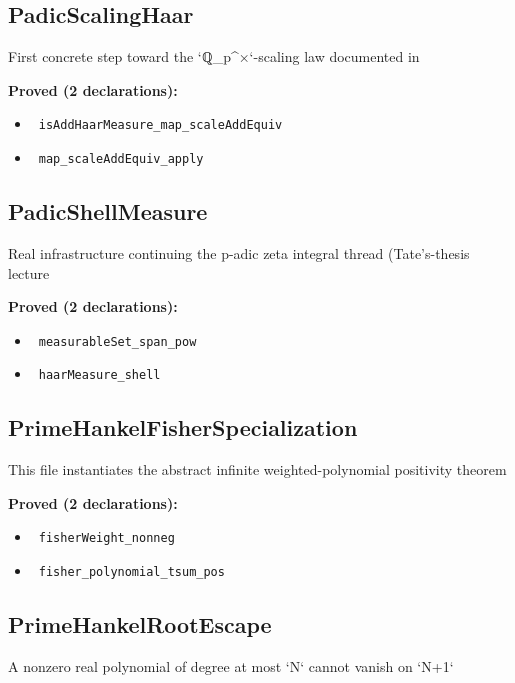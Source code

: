 \documentclass{report}
\theoremstyle{definition}
\begin{document}
\subsection{PadicScalingHaar}
First concrete step toward the `ℚ\_p^×`-scaling law documented in

\noindent\textbf{Proved (2 declarations):}
\begin{itemize}
  \item {}\leanok\ \texttt{isAddHaarMeasure\_map\_scaleAddEquiv}
  \item {}\leanok\ \texttt{map\_scaleAddEquiv\_apply}
\end{itemize}

\subsection{PadicShellMeasure}
Real infrastructure continuing the p-adic zeta integral thread (Tate's-thesis lecture

\noindent\textbf{Proved (2 declarations):}
\begin{itemize}
  \item {}\leanok\ \texttt{measurableSet\_span\_pow}
  \item {}\leanok\ \texttt{haarMeasure\_shell}
\end{itemize}

\subsection{PrimeHankelFisherSpecialization}
This file instantiates the abstract infinite weighted-polynomial positivity theorem

\noindent\textbf{Proved (2 declarations):}
\begin{itemize}
  \item {}\leanok\ \texttt{fisherWeight\_nonneg}
  \item {}\leanok\ \texttt{fisher\_polynomial\_tsum\_pos}
\end{itemize}

\subsection{PrimeHankelRootEscape}
A nonzero real polynomial of degree at most `N` cannot vanish on `N+1`
\end{document}
